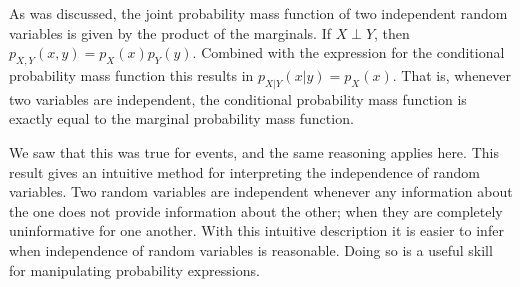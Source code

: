\documentclass[
  letterpaper,
  DIV=11,
  numbers=noendperiod]{scrreprt}
\theoremstyle{definition}
\theoremstyle{definition}
\theoremstyle{definition}
\theoremstyle{remark}
\begin{document}
As was discussed, the joint probability mass function of two independent
random variables is given by the product of the marginals. If
\(X\perp Y\), then \(p_{X,Y}(x,y) = p_{X}(x)p_{Y}(y)\). Combined with
the expression for the conditional probability mass function this
results in \(p_{X|Y}(x|y) = p_X(x)\). That is, whenever two variables
are independent, the conditional probability mass function is exactly
equal to the marginal probability mass function.

We saw that this was true for events, and the same reasoning applies
here. This result gives an intuitive method for interpreting the
independence of random variables. Two random variables are independent
whenever any information about the one does not provide information
about the other; when they are completely uninformative for one another.
With this intuitive description it is easier to infer when independence
of random variables is reasonable. Doing so is a useful skill for
manipulating probability expressions.
\end{document}
